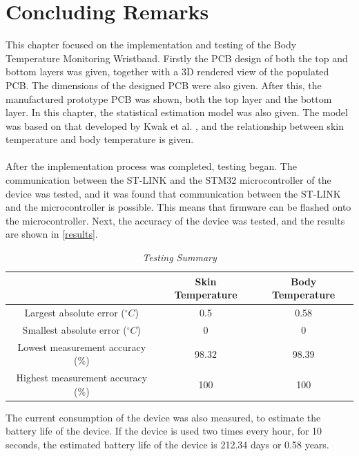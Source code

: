 \section{Concluding Remarks}
This chapter focused on the implementation and testing of the Body Temperature Monitoring Wristband. Firstly the PCB design of both the top and bottom layers was given, together with a 3D rendered view of the populated PCB. The dimensions of the designed PCB were also given. After this, the manufactured prototype PCB was shown, both the top layer and the bottom layer. In this chapter, the statistical estimation model was also given. The model was based on that developed by Kwak et al. \cite{Kwak2019}, and the relationship between skin temperature and body temperature is given.
\\
\\
After the implementation process was completed, testing began. The communication between the ST-LINK and the STM32 microcontroller of the device was tested, and it was found that communication between the ST-LINK and the microcontroller is possible. This means that firmware can be flashed onto the microcontroller. Next, the accuracy of the device was tested, and the results are shown in \autoref{results}.
\begin{table}[H]
	\centering
	\caption{\textit{Testing Summary}}
	\label{results}
	\begin{tabular}{|c|c|c|}
		\hline
		\textbf{} & \textbf{Skin Temperature} & \textbf{Body Temperature} \\
		\hline
		\hline
		Largest absolute error ($ ^{\circ} C $) & 0.5 & 0.58\\
		\hline
		Smallest absolute error ($ ^{\circ} C $) & 0 & 0\\
		\hline
		Lowest measurement accuracy (\%) & 98.32 & 98.39\\
		\hline
		Highest measurement accuracy (\%) & 100 & 100\\
		\hline
	\end{tabular}
\end{table}
\noindent
The current consumption of the device was also measured, to estimate the battery life of the device. If the device is used two times every hour, for 10 seconds, the estimated battery life of the device is 212.34 days or 0.58 years.


